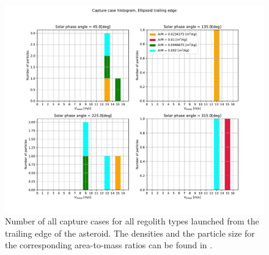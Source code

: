 \begin{figure}[htb]
\centering
\captionsetup{justification=centering}
\includegraphics[width=\textwidth, height=0.5\textheight, keepaspectratio=true]{trailing_edge_perturbations/allCaptureCases.pdf}
\caption{Number of all capture cases for all regolith types launched from the trailing edge of the asteroid. The densities and the particle size for the corresponding area-to-mass ratios can be found in .}
\label{fig:trailingEdge_allParticles_capture_hist}
\end{figure}
\FloatBarrier
